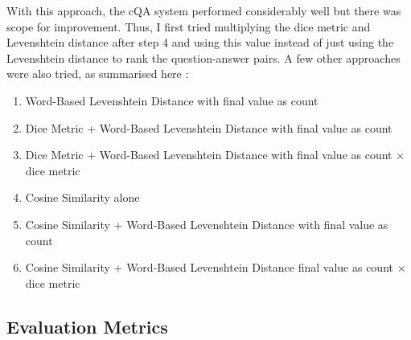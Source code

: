 \documentclass[12pt, a4paper]{article}
\begin{document}
With this approach, the cQA system performed considerably well but there was scope for improvement. Thus, I first tried multiplying the dice metric and Levenshtein distance after step 4 and using this value instead of just using the Levenshtein distance to rank the question-answer pairs. A few other approaches were also tried, as summarised here : 

\begin{enumerate}
    \item Word-Based Levenshtein Distance with final value as count 
    \item Dice Metric + Word-Based Levenshtein Distance with final value as count 
    \item Dice Metric + Word-Based Levenshtein Distance with final value as count \(\times\) dice metric 
    \item Cosine Similarity alone 
    \item Cosine Similarity + Word-Based Levenshtein Distance with final value as count 
    \item Cosine Similarity + Word-Based Levenshtein Distance final value as count \(\times\) dice metric
\end{enumerate}

\subsection{Evaluation Metrics} 
\end{document}
